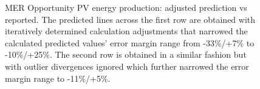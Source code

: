 \begin{figure}[h]
\begin{subfigure}[t]{\subfigureWidth}
		\label{fig:plot:sub:mer-energy-production-predicted-vs-reported-my32-adjusted-without-outliers}
	\end{subfigure}
    \caption[\ac{MER} Opportunity \ac{PV} energy production: adjusted prediction vs reported]
            {\ac{MER} Opportunity \ac{PV} energy production: adjusted prediction vs reported. The predicted lines across the first row are obtained with iteratively determined calculation adjustments that narrowed the calculated predicted values' error margin range from -33\%/+7\% to -10\%/+25\%. The second row is obtained in a similar fashion but with outlier divergences ignored which further narrowed the error margin range to -11\%/+5\%.}
    \label{fig:plot:mer-energy-production-predicted-vs-reported-adjusted-with-and-without-outliers}
\vspace{-2ex}
\end{figure}

\clearpage


